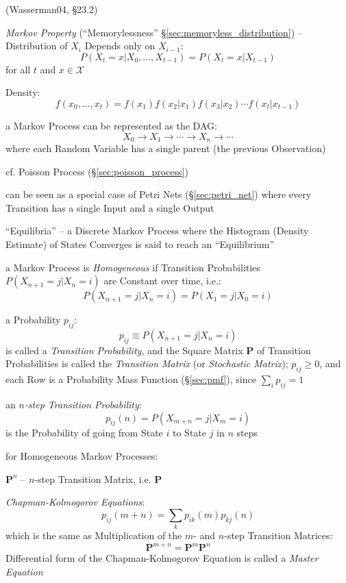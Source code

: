 
(Wasserman04, \S23.2)

\emph{Markov Property} (``Memorylessness'' \S\ref{sec:memoryless_distribution})
-- Distribution of $X_i$ Depends only on $X_{i-1}$:
\[
  P(X_t = x | X_0, \ldots, X_{t-1}) = P(X_t = x | X_{t-1})
\]
for all $t$ and $x \in \mathcal{X}$

Density:
\[
  f(x_0, \ldots, x_t) = f(x_1)f(x_2|x_1)f(x_3|x_2) \cdots f(x_t|x_{t-1})
\]

a Markov Process can be represented as the DAG:
\[
  X_0 \longrightarrow X_1 \longrightarrow \cdots \longrightarrow X_n
    \longrightarrow \cdots
\]
where each Random Variable has a single parent (the previous Observation)

cf. Poisson Process (\S\ref{sec:poisson_process})

\fist can be seen as a special case of Petri Nets (\S\ref{sec:petri_net}) where
every Transition has a single Input and a single Output

``Equilibria'' -- a Discrete Markov Process where the Histogram (Density
Estimate) of States Converges is said to reach an ``Equilibrium''

a Markov Process is \emph{Homogeneous} if Transition Probabilities
$P(X_{n+1} = j | X_n = i)$ are Constant over time, i.e.:
\[
  P(X_{n+1} = j | X_n = i) = P(X_1 = j| X_0 = i)
\]

a Probability $p_{ij}$:
\[
  p_{ij} \equiv P(X_{n+1} = j | X_n = i)
\]
is called a \emph{Transition Probability}, and the Square Matrix $\mathbf{P}$ of
Transition Probabilities is called the \emph{Transition Matrix} (or
\emph{Stochastic Matrix});
$p_{ij} \geq 0$, and each Row is a Probability Mass Function (\S\ref{sec:pmf}),
since $\sum_i p_{ij} = 1$

an \emph{$n$-step Transition Probability}:
\[
  p_{ij}(n) = P(X_{m+n} = j | X_m = i)
\]
is the Probability of going from State $i$ to State $j$ in $n$ steps

for Homogeneous Markov Processes:

$\mathbf{P}^n$ -- $n$-step Transition Matrix, i.e. $\mathbf{P}$

\emph{Chapman-Kolmogorov Equations}:
\[
  p_{ij}(m + n) = \sum_k p_{ik}(m) p_{kj}(n)
\]
which is the same as Multiplication of the $m$- and $n$-step Transition
Matrices:
\[
  \mathbf{P}^{m+n} = \mathbf{P}^m \mathbf{P}^n
\]
Differential form of the Chapman-Kolmogorov Equation is called a
\emph{Master Equation}


